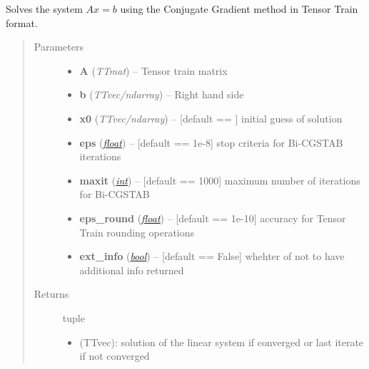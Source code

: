\documentclass[a4paper,10pt,english]{sphinxmanual}
\begin{document}
\begin{fulllineitems}
\label{api-multilinalg:TensorToolbox.multilinalg.cg}
Solves the system \(Ax=b\) using the Conjugate Gradient method in Tensor Train format.
\begin{quote}\begin{description}
\item[{Parameters}] \leavevmode\begin{itemize}
\item {} 
\textbf{A} (\emph{TTmat}) -- Tensor train matrix

\item {} 
\textbf{b} (\emph{TTvec/ndarray}) -- Right hand side

\item {} 
\textbf{x0} (\emph{TTvec/ndarray}) -- {[}default == {\hyperref[api-core:TensorToolbox.core.zerosvec]{}}{]} initial guess of solution 

\item {} 
\textbf{eps} (\href{http://docs.python.org/library/functions.html\#float}{\emph{float}}) -- {[}default == 1e-8{]} stop criteria for Bi-CGSTAB iterations

\item {} 
\textbf{maxit} (\href{http://docs.python.org/library/functions.html\#int}{\emph{int}}) -- {[}default == 1000{]} maximum number of iterations for Bi-CGSTAB

\item {} 
\textbf{eps\_round} (\href{http://docs.python.org/library/functions.html\#float}{\emph{float}}) -- {[}default == 1e-10{]} accuracy for Tensor Train rounding operations

\item {} 
\textbf{ext\_info} (\href{http://docs.python.org/library/functions.html\#bool}{\emph{bool}}) -- {[}default == False{]} whehter of not to have additional info returned

\end{itemize}

\item[{Returns}] \leavevmode

tuple 
\begin{itemize}
\item {} 
 (TTvec): solution of the linear system if converged or last iterate if not converged


\end{itemize}
\end{description}
\end{quote}
\end{fulllineitems}
\end{document}
